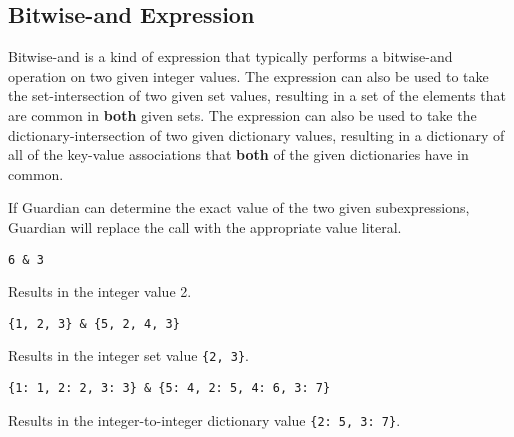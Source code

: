 
\subsection{Bitwise-and Expression}
{
	Bitwise-and is a kind of expression that typically performs
	a bitwise-and operation on two given integer values.
	The expression can also be used to take the set-intersection of two given
	set values, resulting in a set of the elements that are
	common in \textbf{both}
	given sets.
	The expression can also be used to take the
	dictionary-intersection of two given
	dictionary values, resulting in a dictionary of all of the key-value
	associations that \textbf{both} of the given dictionaries have in common.
	
	If Guardian can determine the exact value of the two given subexpressions,
	Guardian will replace the call with the appropriate value literal.
	
	\begin{itemize}
	{
		\item[] \lstinline[language=MAIA, columns=fixed]@6 & 3@
		
			Results in the integer value 2.
		
		\item[] \lstinline[language=MAIA, columns=fixed]@{1, 2, 3} & {5, 2, 4, 3}@
		
			Results in the integer set value \lstinline[language=MAIA, columns=fixed]@{2, 3}@.
		
		\item[] \lstinline[language=MAIA, columns=fixed]@{1: 1, 2: 2, 3: 3} & {5: 4, 2: 5, 4: 6, 3: 7}@
		
			Results in the integer-to-integer dictionary value \lstinline[language=MAIA, columns=fixed]@{2: 5, 3: 7}@.
	}
	\end{itemize}
}
